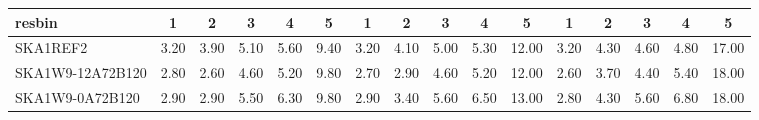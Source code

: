 \begin{table}[!htp]
{{\begin{tabular}{|lccccc||ccccc||ccccc|}
 resbin  &1 & 2 & 3 & 4 & 5 & 1 & 2 & 3 & 4 & 5 & 1 & 2 & 3 & 4 & 5 \\ \hline
SKA1REF2 & 3.20 \cellcolor{blue!60.00} & 3.90 \cellcolor{red!60.00} & 5.10 \cellcolor{green!41.33} & 5.60 \cellcolor{orange!33.27} & 9.40 \cellcolor{purple!18.00} & 3.20 \cellcolor{blue!60.00} & 4.10 \cellcolor{red!60.00} & 5.00 \cellcolor{green!34.80} & 5.30 \cellcolor{orange!21.23} & 12.00 \cellcolor{purple!18.00} & 3.20 \cellcolor{blue!60.00} & 4.30 \cellcolor{red!60.00} & 4.60 \cellcolor{green!25.00} & 4.80 \cellcolor{orange!18.00} & 17.00 \cellcolor{purple!18.00}\\ \hline 
SKA1W9-12A72B120 & 2.80 \cellcolor{blue!18.00} & 2.60 \cellcolor{red!18.00} & 4.60 \cellcolor{green!18.00} & 5.20 \cellcolor{orange!18.00} & 9.80 \cellcolor{purple!60.00} & 2.70 \cellcolor{blue!18.00} & 2.90 \cellcolor{red!18.00} & 4.60 \cellcolor{green!18.00} & 5.20 \cellcolor{orange!18.00} & 12.00 \cellcolor{purple!18.00} & 2.60 \cellcolor{blue!18.00} & 3.70 \cellcolor{red!18.00} & 4.40 \cellcolor{green!18.00} & 5.40 \cellcolor{orange!30.60} & 18.00 \cellcolor{purple!60.00}\\ \hline 
SKA1W9-0A72B120 & 2.90 \cellcolor{blue!28.50} & 2.90 \cellcolor{red!27.69} & 5.50 \cellcolor{green!60.00} & 6.30 \cellcolor{orange!60.00} & 9.80 \cellcolor{purple!60.00} & 2.90 \cellcolor{blue!34.80} & 3.40 \cellcolor{red!35.50} & 5.60 \cellcolor{green!60.00} & 6.50 \cellcolor{orange!60.00} & 13.00 \cellcolor{purple!60.00} & 2.80 \cellcolor{blue!32.00} & 4.30 \cellcolor{red!60.00} & 5.60 \cellcolor{green!60.00} & 6.80 \cellcolor{orange!60.00} & 18.00 \cellcolor{purple!60.00}\\ \hline 
\end{tabular}}
\hspace{1cm} 
}
\end{table}
